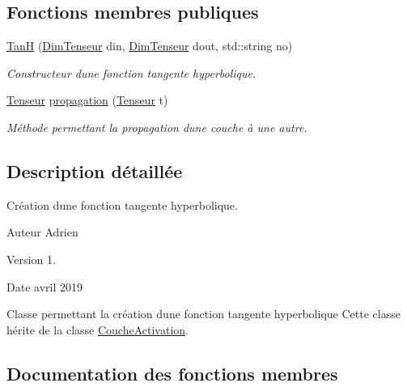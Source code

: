 \subsection*{Fonctions membres publiques}
\begin{DoxyCompactItemize}
\item 
\mbox{\label{classTanH_a15a43acf406e3ed45c632bcd451f97f6}} 
\hyperlink{classTanH_a15a43acf406e3ed45c632bcd451f97f6}{TanH} (\hyperlink{classDimTenseur}{Dim\+Tenseur} din, \hyperlink{classDimTenseur}{Dim\+Tenseur} dout, std\+::string no)
\begin{DoxyCompactList}\small\item\em Constructeur d\textquotesingle{}une fonction tangente hyperbolique. \end{DoxyCompactList}\item 
\hyperlink{classTenseur}{Tenseur} \hyperlink{classTanH_a869967c9b278c6592e6fcc04b61a5f0c}{propagation} (\hyperlink{classTenseur}{Tenseur} t)
\begin{DoxyCompactList}\small\item\em Méthode permettant la propagation d\textquotesingle{}une couche à une autre. \end{DoxyCompactList}\end{DoxyCompactItemize}


\subsection{Description détaillée}
Création d\textquotesingle{}une fonction tangente hyperbolique. 

\begin{DoxyAuthor}{Auteur}
Adrien 
\end{DoxyAuthor}
\begin{DoxyVersion}{Version}
1. 
\end{DoxyVersion}
\begin{DoxyDate}{Date}
avril 2019
\end{DoxyDate}
Classe permettant la création d\textquotesingle{}une fonction tangente hyperbolique Cette classe hérite de la classe \hyperlink{classCoucheActivation}{Couche\+Activation}. 

\subsection{Documentation des fonctions membres}
\mbox{\label{classTanH_a869967c9b278c6592e6fcc04b61a5f0c}} 
